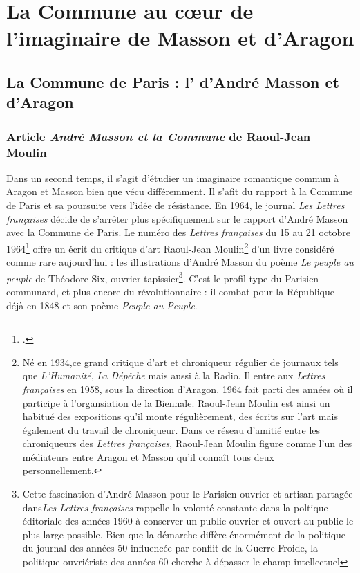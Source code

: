 \chapter{La Commune au c\oe{}ur de l'imaginaire de Masson et d'Aragon}

\section{La Commune de Paris : l' d'André Masson et d'Aragon }

\subsection{Article \emph{André Masson et la Commune} de Raoul-Jean Moulin }

Dans un second temps, il s’agit d'étudier un imaginaire romantique  commun à Aragon et Masson bien que vécu différemment. Il s'afit du rapport à la Commune de Paris et sa poursuite vers l’idée de résistance. En 1964, le journal \emph{Les Lettres françaises} décide de s’arrêter plus spécifiquement sur le rapport d’André Masson avec la Commune de Paris. Le numéro des \emph{Lettres françaises} du 15 au 21 octobre 1964\footcite{commune} offre un écrit du critique d’art Raoul-Jean Moulin\footnote{Né en 1934,ce grand critique d'art et chroniqueur régulier de journaux tels que \emph{L'Humanité}, \emph{La Dépêche} mais aussi à la Radio. Il entre aux \emph{Lettres françaises} en 1958, sous la direction d'Aragon. 1964 fait parti des années où il participe à l'organsiation de la Biennale. Raoul-Jean Moulin est ainsi un habitué des expositions qu'il monte régulièrement, des écrits sur l'art mais également du travail de chroniqueur. Dans ce réseau d'amitié entre les chroniqueurs des \emph{Lettres françaises}, Raoul-Jean Moulin figure comme l'un des médiateurs entre Aragon et Masson qu'il connaît tous deux personnellement.} d’un livre considéré comme rare aujourd’hui : les illustrations d’André Masson du poème \emph{Le peuple au peuple} de Théodore Six, ouvrier tapissier\footnote{Cette fascination d'André Masson pour le Parisien ouvrier et artisan partagée dans\emph{Les Lettres françaises} rappelle la volonté constante dans la poltique éditoriale des années 1960 à conserver un public ouvrier et ouvert au public le plus large possible. Bien que la démarche diffère énormément de la politique du journal des années 50 influencée par conflit de la Guerre Froide, la politique ouvriériste des années 60 cherche à dépasser le champ intellectuel}. C'est le profil-type du Parisien communard, et plus encore du révolutionnaire : il combat pour la République déjà en 1848 et son poème \emph{Peuple au Peuple}. 

